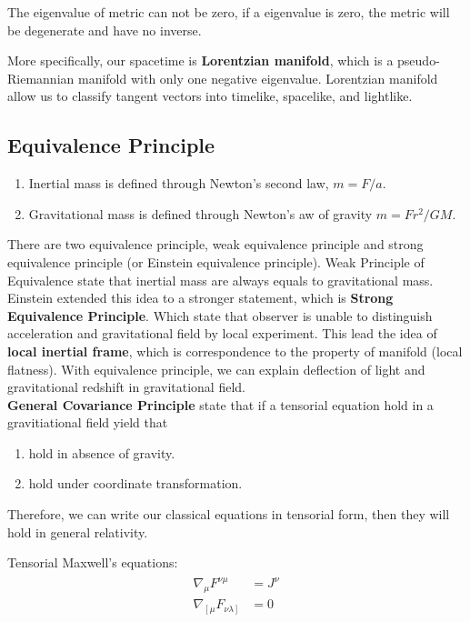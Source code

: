 \documentclass[12pt]{article}
\theoremstyle{mystyle}{\newtheorem{definition}{Definition}[section]}
\theoremstyle{mystyle}{\newtheorem{theorem}[definition]{Theorem}}
\theoremstyle{mystyle}{\newtheorem*{remark}{Remark}}
\theoremstyle{mystyle}{\newtheorem*{example}{Example}}
\theoremstyle{mystyle}{\newtheorem*{examples}{Examples}}
\theoremstyle{cstyle}{\newtheorem*{cthm}{}}
\begin{document}
\begin{remark}
  The eigenvalue of metric can not be zero, if a eigenvalue is zero, the metric will be degenerate and have no inverse.
\end{remark}

More specifically, our spacetime is \textbf{Lorentzian manifold}, which is a pseudo-Riemannian manifold with only one negative eigenvalue.
Lorentzian manifold allow us to classify tangent vectors into timelike, spacelike, and lightlike.

\subsection{Equivalence Principle}
\begin{definition}
  \textbf{  }
  \begin{enumerate}
    \item Inertial mass is defined through Newton's second law, \(m = F/a\).
    \item Gravitational mass is defined through Newton's aw of gravity \(m = Fr^2/GM\).
  \end{enumerate}
\end{definition}

There are two equivalence principle, weak equivalence principle and strong equivalence principle
(or Einstein equivalence principle). Weak Principle of Equivalence state that inertial mass are always equals to gravitational mass.
Einstein extended this idea to a stronger statement, which is \textbf{Strong Equivalence Principle}.
Which state that observer is unable to distinguish acceleration and gravitational field by local experiment.
This lead the idea of \textbf{local inertial frame}, which is correspondence to the property of manifold (local flatness).
With equivalence principle, we can explain deflection of light and gravitational redshift in gravitational field.\\
\textbf{General Covariance Principle} state that if a tensorial equation hold in a gravitiational field yield that

\begin{enumerate}
  \item hold in absence of gravity.
  \item hold under coordinate transformation.
\end{enumerate}
Therefore, we can write our classical equations in tensorial form, then they will hold in general relativity.

\begin{example}
  Tensorial Maxwell's equations:
  \begin{align*}
    \begin{split}
      \nabla_{\mu}F^{\nu\mu} &= J^{\nu}\\
      \nabla_{\left[ \mu\right.}F_{\left. \nu\lambda \right]} &= 0
    \end{split}
  \end{align*}
\end{example}
\end{document}
